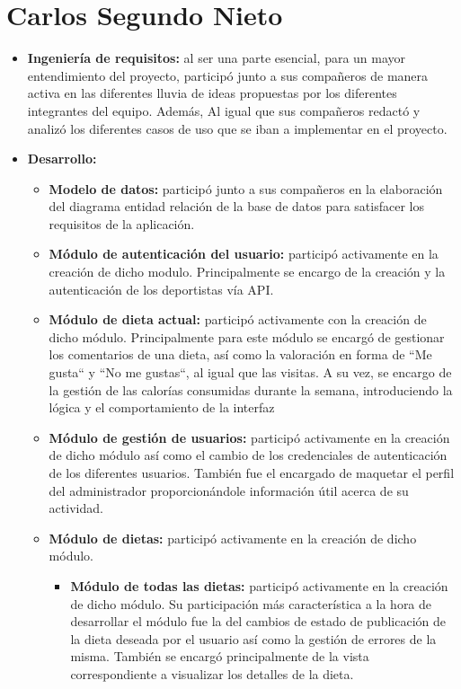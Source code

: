 \section{Carlos Segundo Nieto}
\begin{itemize}
    \item \textbf{Ingeniería de requisitos:} al ser una parte esencial, para un mayor entendimiento del proyecto, participó junto a sus compañeros de manera activa en las diferentes lluvia de ideas propuestas por los diferentes integrantes del equipo. Además, Al igual que sus compañeros redactó y analizó los diferentes casos de uso que se iban a implementar en el proyecto.
    \item \textbf{Desarrollo:}
        \begin{itemize}
            \item \textbf{Modelo de datos:} participó junto a sus compañeros en la elaboración del diagrama entidad relación de la base de datos para satisfacer los requisitos de la aplicación.
            \item \textbf{Módulo de autenticación del usuario:} participó activamente en la creación de dicho modulo. Principalmente se encargo de la creación y la autenticación de los deportistas vía API.
            \item \textbf{Módulo de dieta actual:} participó activamente con la creación de dicho módulo. Principalmente para este módulo se encargó de gestionar los comentarios de una dieta, así como la valoración en forma de ``Me gusta`` y ``No me gustas``, al igual que las visitas. A su vez, se encargo de la gestión de las calorías consumidas durante la semana, introduciendo la lógica y el comportamiento de la interfaz
            \item \textbf{Módulo de gestión de usuarios:} participó activamente en la creación de dicho módulo así como el cambio de los credenciales de autenticación de los diferentes usuarios. También fue el encargado de maquetar el perfil del administrador proporcionándole información útil acerca de su actividad.
            \item \textbf{Módulo de dietas:} participó activamente en la creación de dicho módulo.
            \begin{itemize}
                \item \textbf{Módulo de todas las dietas:} participó activamente en la creación de dicho módulo. Su participación más característica a la hora de desarrollar el módulo fue la del cambios de estado de publicación de la dieta deseada por el usuario así como la gestión de errores de la misma. También se encargó principalmente de la vista correspondiente a visualizar los detalles de la dieta.

\end{itemize}
\end{itemize}
\end{itemize}
